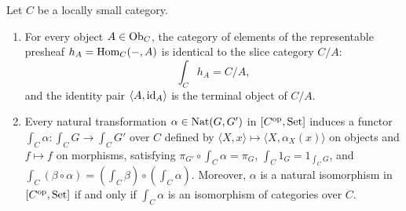 \documentclass[10pt,a4paper]{article}
\begin{document}
\begin{theorem}\label{thm:slice_el}
Let $C$ be a locally small category.
\begin{enumerate}
\item For every object $A \in {\textrm{Ob}}_C$, the category of elements of the representable presheaf $h_A = {\textrm{Hom}}_C(-, A)$ is identical to the slice category $C / A$:
$$\int_C h_A = C / A,$$
and the identity pair $\langle A, {\textrm{id}}_A \rangle$ is the terminal object of $C / A$.
\item Every natural transformation $\alpha \in {\textrm{Nat}}(G, G')$ in $[C^{\textrm{op}}, {\textrm{Set}}]$ induces a functor $\int_C \alpha : \int_C G \to \int_C G'$ over $C$ defined by $\langle X, x \rangle \mapsto \langle X, \alpha_X(x) \rangle$ on objects and $f \mapsto f$ on morphisms, satisfying $\pi_{G'} \circ \int_C \alpha = \pi_G$, $\int_C 1_G = 1_{\int_C G}$, and $\int_C (\beta \circ \alpha) = (\int_C \beta) \circ (\int_C \alpha)$. Moreover, $\alpha$ is a natural isomorphism in $[C^{\textrm{op}}, {\textrm{Set}}]$ if and only if $\int_C \alpha$ is an isomorphism of categories over $C$.
\end{enumerate}
\end{theorem}
\myprf
\end{document}
